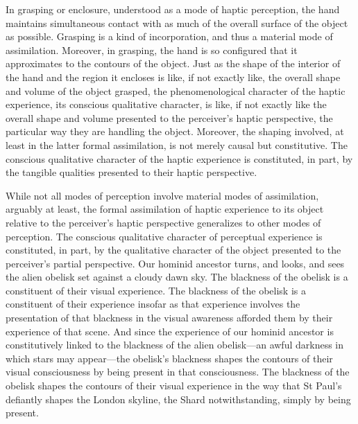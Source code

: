 In grasping or enclosure, understood as a mode of haptic perception, the hand maintains simultaneous contact with as much of the overall surface of the object as possible. Grasping is a kind of incorporation, and thus a material mode of assimilation. Moreover, in grasping, the hand is so configured that it approximates to the contours of the object. Just as the shape of the interior of the hand and the region it encloses is like, if not exactly like, the overall shape and volume of the object grasped, the phenomenological character of the haptic experience, its conscious qualitative character, is like, if not exactly like the overall shape and volume presented to the perceiver's haptic perspective, the particular way they are handling the object. Moreover, the shaping involved, at least in the latter formal assimilation, is not merely causal but constitutive. The conscious qualitative character of the haptic experience is constituted, in part, by the tangible qualities presented to their haptic perspective.

While not all modes of perception involve material modes of assimilation, arguably at least, the formal assimilation of haptic experience to its object relative to the perceiver's haptic perspective generalizes to other modes of perception. The conscious qualitative character of perceptual experience is constituted, in part, by the qualitative character of the object presented to the perceiver's partial perspective. Our hominid ancestor turns, and looks, and sees the alien obelisk set against a cloudy dawn sky. The blackness of the obelisk is a constituent of their visual experience. The blackness of the obelisk is a constituent of their experience insofar as that experience involves the presentation of that blackness in the visual awareness afforded them by their experience of that scene. And since the experience of our hominid ancestor is constitutively linked to the blackness of the alien obelisk---an awful darkness in which stars may appear---the obelisk’s blackness shapes the contours of their visual consciousness by being present in that consciousness. The blackness of the obelisk shapes the contours of their visual experience in the way that St Paul’s defiantly shapes the London skyline, the Shard notwithstanding, simply by being present. 

